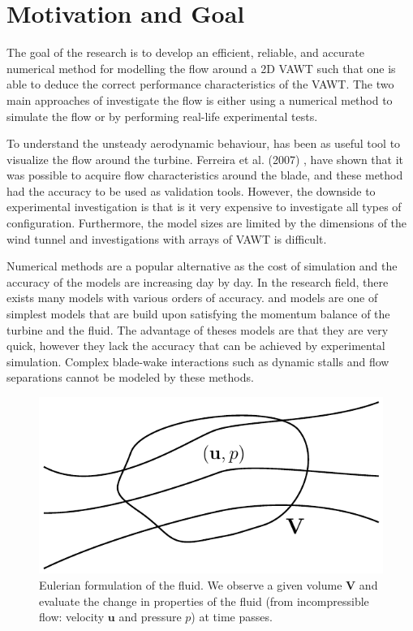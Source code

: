 \section{Motivation and Goal}
The goal of the research is to develop an efficient, reliable, and accurate numerical method for modelling the flow around a 2D VAWT such that one is able to deduce the correct performance characteristics of the VAWT. The two main approaches of investigate the flow is either using a numerical method to simulate the flow or by performing real-life experimental tests.

To understand the unsteady aerodynamic behaviour,  has been as useful tool to visualize the flow around the turbine. Ferreira et al. (2007) \cite{Ferreira2007}, have shown that it was possible to acquire flow characteristics around the blade, and these method had the accuracy to be used as validation tools. However, the downside to experimental investigation is that is it very expensive to investigate all types of configuration. Furthermore, the model sizes are limited by the dimensions of the wind tunnel and investigations with arrays of VAWT is difficult.

Numerical methods are a popular alternative as the cost of simulation and the accuracy of the models are increasing day by day. In the research field, there exists many models with various orders of accuracy.  and  models are one of simplest models that are build upon satisfying the momentum balance of the turbine and the fluid. The advantage of theses models are that they are very quick, however they lack the accuracy that can be achieved by experimental simulation. Complex blade-wake interactions such as dynamic stalls and flow separations cannot be modeled by these methods.

	\begin{figure}[!b]
		\centering
		\includegraphics[width=0.4\linewidth]{figures/introduction/eulerianRF.pdf}
		\caption{Eulerian formulation of the fluid. We observe a given volume $\mathbf{V}$ and evaluate the change in properties of the fluid (from incompressible flow: velocity $\mathbf{u}$ and pressure $p$) at time passes.}
		\label{fig:eulerianRF}
	\end{figure}

